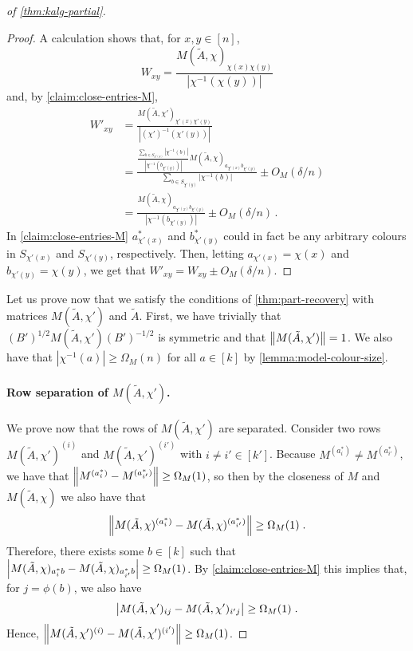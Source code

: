\begin{proof}[of \cref{thm:kalg-partial}]
    \begin{proof}
    A calculation shows that, for $x,y \in [n]$,
    \[W_{xy} = \frac{M(\tilde{A}, \chi)_{\chi(x)\chi(y)}}{|\chi^{-1}(\chi(y))|}\] 
    and, by \cref{claim:close-entries-M}, 
    \begin{align*}
    W'_{xy}
    &= \frac{M(\tilde{A}, \chi')_{\chi'(x)\chi'(y)}}{|(\chi')^{-1}(\chi'(y))|}\\
    &= \frac{ \frac{\sum_{b \in S_{\chi'(y)}} |\chi^{-1}(b)|}{|\chi^{-1}(b_{\chi'(y)})|} M(\tilde{A}, \chi)_{a_{\chi'(x)}b_{\chi'(y)}}}{\sum_{b \in S_{\chi'(y)}} |\chi^{-1}(b)|} \pm O_M(\delta/n)\\
    &= \frac{ M(\tilde{A}, \chi)_{a_{\chi'(x)}b_{\chi'(y)}}}{|\chi^{-1}(b_{\chi'(y)})|} \pm O_M(\delta/n)\,.
    \end{align*}
    In \cref{claim:close-entries-M} $a^*_{\chi'(x)}$ and $b^*_{\chi'(y)}$ could in fact be any arbitrary colours in $S_{\chi'(x)}$ and $S_{\chi'(y)}$, respectively.
    Then, letting $a_{\chi'(x)} = \chi(x)$ and $b_{\chi'(y)} = \chi(y)$, we get that $W'_{xy} = W_{xy} \pm O_M(\delta/n)$.
    \end{proof}

    Let us prove now that we satisfy the conditions of \cref{thm:part-recovery} with matrices $M(\tilde{A}, \chi')$ and $\tilde{A}$.
    First, we have trivially that $(B')^{1/2} M(\tilde{A}, \chi') (B')^{-1/2}$ is symmetric and that $\left\lVert M(\tilde{A}, \chi')\right\rVert = 1$.
    We also have that $|\chi^{-1}(a)| \geq \Omega_M(n)$ for all $a \in [k]$ by \cref{lemma:model-colour-size}.
    
    \paragraph{Row separation of $M(\tilde{A}, \chi')$.}
    We prove now that the rows of $M(\tilde{A}, \chi')$ are separated.
    Consider two rows $M(\tilde{A}, \chi')^{(i)}$ and $M(\tilde{A}, \chi')^{(i')}$ with $i \neq i' \in [k']$.
    Because $M^{(a^*_i)} \neq M^{(a^*_{i'})}$, we have that $\left\lVert M^{(a^*_i)} - M^{(a^*_{i'})}\right\rVert \geq \Omega_M(1)$, so then by the closeness of $M$ and $M(\tilde{A}, \chi)$ we also have that \[\left\lVert M(\tilde{A}, \chi)^{(a^*_i)} - M(\tilde{A}, \chi)^{(a^*_{i'})}\right\rVert \geq \Omega_M(1)\;.\]
    Therefore, there exists some $b \in [k]$ such that $\left\lvert M(\tilde{A}, \chi)_{a^*_ib} - M(\tilde{A}, \chi)_{a^*_{i'}b}\right\rvert \geq \Omega_M(1)$.
    By \cref{claim:close-entries-M} this implies that, for $j = \phi(b)$, we also have \[\left\lvert M(\tilde{A}, \chi')_{i j} - M(\tilde{A}, \chi')_{i' j}\right\rvert \geq \Omega_M(1)\;.\]
    Hence, $\left\lVert M(\tilde{A}, \chi')^{(i)} - M(\tilde{A}, \chi')^{(i')}\right\rVert \geq \Omega_M(1)$.


\end{proof}
